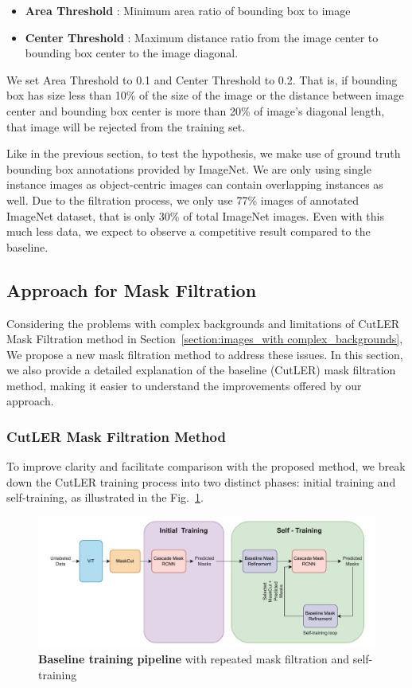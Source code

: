 \begin{itemize}
	\item \textbf{Area Threshold} : Minimum area ratio of bounding box to image
	\item \textbf{Center Threshold} : Maximum distance ratio from the image center to bounding box center to the image diagonal.
\end{itemize}

We set Area Threshold to 0.1 and Center Threshold to 0.2. That is, if bounding box has size less than 10\% of the size of the image or the distance between image center and bounding box center is more than 20\% of image's diagonal length, that image will be rejected from the training set.

Like in the previous section, to test the hypothesis, we make use of ground truth bounding box annotations provided by ImageNet. We are only using single instance images as object-centric images can contain overlapping instances as well. Due to the filtration process, we only use 77\% images of annotated ImageNet dataset, that is only 30\% of total ImageNet images. Even with this much less data, we expect to observe a competitive result compared to the baseline. 


\subsection{Approach for Mask Filtration}
\label{section:Mask-Filtration}
Considering the problems with complex backgrounds and limitations of CutLER Mask Filtration method in Section~\ref{section:images_with complex_backgrounds}, We propose a new mask filtration method to address these issues. In this section, we also provide a detailed explanation of the baseline (CutLER) mask filtration method, making it easier to understand the improvements offered by our approach.

\subsubsection{CutLER Mask Filtration Method}
\label{sec:baseline_mask_filteration}
To improve clarity and facilitate comparison with the proposed method, we break down the CutLER training process into two distinct phases: initial training and self-training, as illustrated in the Fig.~\ref{fig:baseline_training}.

\begin{figure}
	\centering
	\includegraphics[width=1\textwidth]{Images/main/baseline_approach.pdf}
	\caption[\textbf{Baseline Training Pipeline}]{\textbf{Baseline training pipeline} with repeated mask filtration and self-training}
	\label{fig:baseline_training}
\end{figure}

